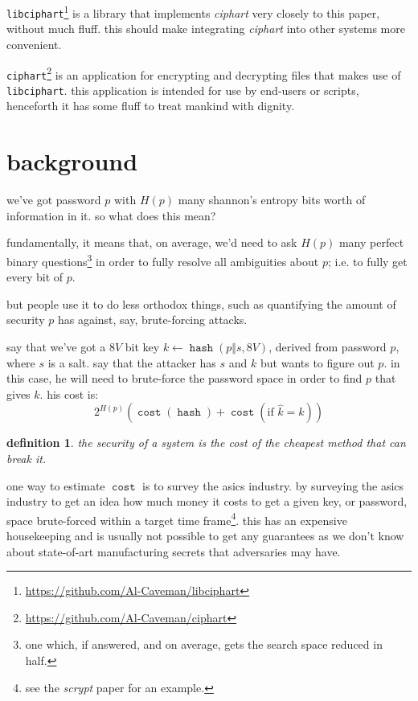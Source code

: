 \documentclass[twocolumn]{article}
\newtheorem{definition}{definition}
\DeclareMathOperator{\hash}{\mathtt{hash}}
\DeclareMathOperator{\cost}{\mathtt{cost}}
\begin{document}
\texttt{libciphart}\footnote{\url{https://github.com/Al-Caveman/libciphart}}
is a library that implements \emph{ciphart} very closely to this paper,
without much fluff.  this should make integrating \emph{ciphart} into other
systems more convenient.

\texttt{ciphart}\footnote{\url{https://github.com/Al-Caveman/ciphart}} is
an application for encrypting and decrypting files that makes use of
\texttt{libciphart}.  this application is intended for use by end-users or
scripts, henceforth it has some fluff to treat mankind with dignity.

\break
\tableofcontents

\section{background}
we've got password $p$ with $H(p)$ many shannon's entropy bits worth of
information in it.  so what does this mean?

fundamentally, it means that, on average, we'd need to ask $H(p)$ many
perfect binary questions\footnote{one which, if answered, and on average,
gets the search space reduced in half.} in order to fully resolve all
ambiguities about $p$; i.e.  to fully get every bit of $p$.  

but people use it to do less orthodox things, such as quantifying the
amount of security $p$ has against, say, brute-forcing attacks.

say that we've got a $8V$ bit key $k \gets \hash(p \Vert s, 8V)$, derived
from password $p$, where $s$ is a salt.  say that the attacker has $s$ and
$k$ but wants to figure out $p$.  in this case, he will need to brute-force
the password space in order to find $p$ that gives $k$.  his cost is:
\begin{equation}\label{eq_cost_passbruteforce}
    2^{H(p)} \left(
        \cost(\hash) + \cost(\text{if } \hat k = k)
    \right)
\end{equation}

\begin{definition}
the security of a system is the cost of the cheapest method that can break
it.
\end{definition}

one way to estimate $\cost$ is to survey the asics industry.  by surveying
the asics industry to get an idea how much money it costs to get a given
key, or password, space brute-forced within a target time
frame\footnote{see the \emph{scrypt} paper for an example.}.  this has an
expensive housekeeping and is usually not possible to get any guarantees as
we don't know about state-of-art manufacturing secrets that adversaries may
have.
\end{document}
